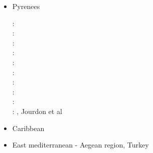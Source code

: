 \begin{itemize}
\begin{scriptsize}
\twothousandeight: \cite{busc08}\cite{strh08}\\
\twothousandten: \cite{hamo10}\cite{joha10}\\
\twothousandeleven: \cite{befa11}\cite{zhxy11}\cite{vasd11}\cite{jabe11}\cite{iahb11}\\
\twothousandtwelve: \cite{zams12}\cite{vald12}\\
\twothousandthirteen: \cite{care13}\cite{chgz13}\cite{chgz13b}\\
\twothousandfourteen: \cite{whbb14}\cite{mutg14}\cite{stjm14}\cite{lesh14}\\
\twothousandfifteen: \cite{puka15}\cite{jarh15}\cite{yoha15}\\
\twothousandsixteen: \cite{kebb16}\cite{staj16}\\
\twothousandseventeen: \cite{bube17}\\
\twothousandeighteen: \cite{pirf18}\cite{pukp18}\cite{flbb18}\\
\twothousandnineteen: \cite{sccs19}\cite{scvm19}\cite{wazg19}\cite{scdh19}\\
\twothousandtwenty: \cite{livn20}\cite{chlc20}\cite{pust20}, Yang et al \cite{yakl20}, Ghosh et al \cite{ghbm20}
\end{scriptsize}

\item {Pyrenees} 
\begin{scriptsize}
\nineteenninetytwo: \cite{chou92}\\
\nineteenninetythree: \cite{qubh93}\\
\nineteenninetyeight: \cite{giju98}\\
\twothousand: \cite{bemh00}\\
\twothousandfour: \cite{mcmg04}\cite{siss04}\\
\twothousandten: \cite{jaml10}\\
\twothousandtwelve: \cite{vime12}\\
\twothousandthirteen: \cite{fihv13b}\\
\twothousandfourteen: \cite{jahm14}\\
\twothousandnineteen: \cite{dual19}, Jourdon et al \cite{jolm19}
\end{scriptsize}

\item{Caribbean} 
{\scriptsize
\cite{vago10}
\cite{vags13}
\cite{bovt14}\cite{vagw14}\cite{necb14}
\cite{homi15}\cite{necb15}
\cite{phvb20}\cite{mugu20}
}
\item{East mediterranean - Aegean region, Turkey} 
\begin{scriptsize}
\cite{mcke78b}
\cite{gabm99}
\cite{cazf10}
\cite{enlm11}
\cite{jofh13}
\cite{ozgw17}
\cite{rohb20}\cite{femb20}
\end{scriptsize}


\end{itemize}

